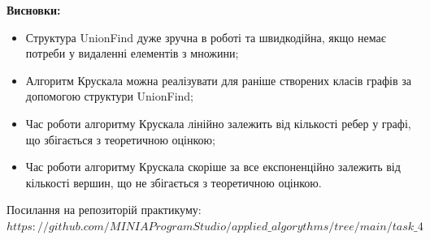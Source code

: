 \documentclass{article}
\begin{document}
\textbf{Висновки:}\\\indent
\begin{itemize}
\item Структура UnionFind дуже зручна в роботі та швидкодійна, якщо немає потреби у видаленні елементів з множини;
\item Алгоритм Крускала можна реалізувати для раніше створених класів графів за допомогою структури UnionFind;
\item Час роботи алгоритму Крускала лінійно залежить від кількості ребер у графі, що збігається з теоретичною оцінкою;
\item Час роботи алгоритму Крускала скоріше за все експоненційно залежить від кількості вершин, що не збігається з теоретичною оцінкою.
\end{itemize}


Посилання на репозиторій практикуму:\\ \href{$https://github.com/MINIAProgramStudio/applied_algorythms/tree/main/task_4$}{$https://github.com/MINIAProgramStudio/applied\_algorythms/tree/main/task\_4$}
\end{document}
